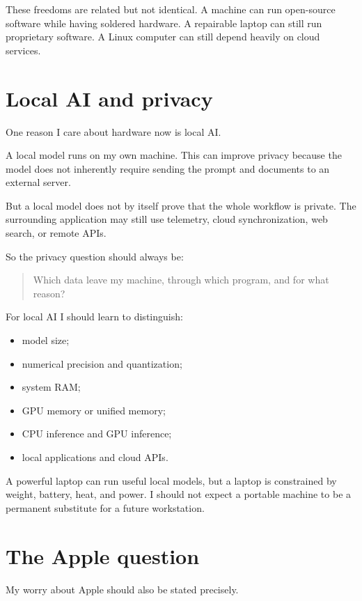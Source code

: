 These freedoms are related but not
identical.  A machine can run open-source
software while having soldered hardware.
A repairable laptop can still run
proprietary software.  A Linux computer
can still depend heavily on cloud services.

\section{Local AI and privacy}
\label{section-computing-systems-local-ai}

One reason I care about hardware now is
local AI.

A local model runs on my own machine.
This can improve privacy because the model
does not inherently require sending the
prompt and documents to an external
server.

But a local model does not by itself prove
that the whole workflow is private.  The
surrounding application may still use
telemetry, cloud synchronization, web
search, or remote APIs.

So the privacy question should always be:

\begin{quote}
Which data leave my machine, through which
program, and for what reason?
\end{quote}

For local AI I should learn to distinguish:

\begin{itemize}
\item model size;
\item numerical precision and
quantization;
\item system RAM;
\item GPU memory or unified memory;
\item CPU inference and GPU inference;
\item local applications and cloud APIs.
\end{itemize}

A powerful laptop can run useful local
models, but a laptop is constrained by
weight, battery, heat, and power.  I should
not expect a portable machine to be a
permanent substitute for a future
workstation.

\section{The Apple question}
\label{section-computing-systems-apple}

My worry about Apple should also be stated
precisely.

